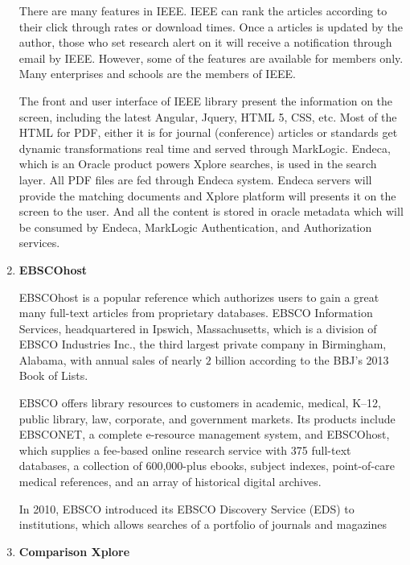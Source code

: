 \begin{enumerate}
	There are many features in IEEE. IEEE can rank the articles according to their click through rates or download times. 
    Once a articles is updated by the author, those who set research alert on it will receive a notification through email by IEEE.
    However, some of the features are available for members only.
    Many enterprises and schools are the members of IEEE.

	
	The front and user interface of IEEE library present the information on the screen, 
	including the latest Angular, Jquery, HTML 5, CSS, etc. 
	Most of the HTML for PDF, either it is for journal (conference) articles or standards get dynamic transformations real time and served through MarkLogic.
	Endeca, which is an Oracle product powers Xplore searches, is used in the search layer.
	All PDF files are fed through Endeca system.
	Endeca servers will provide the matching documents and Xplore platform will presents it on the screen to the user.
	And all the content is stored in oracle metadata which will be consumed by Endeca, MarkLogic Authentication, and Authorization services.
	
	\item\textbf{EBSCOhost}
	\setlength{\parindent}{1em}

	EBSCOhost is a popular reference which authorizes users to gain a great many full-text articles from proprietary databases.
	EBSCO Information Services, headquartered in Ipswich, Massachusetts, 
    which is a division of EBSCO Industries Inc., 
    the third largest private company in Birmingham, Alabama, with annual sales of nearly $2$ billion according to the BBJ's 2013 Book of Lists.

    EBSCO offers library resources to customers in academic, medical, K–12,  
    public library, law, corporate, and government markets. 
	Its products include EBSCONET, a complete e-resource management system,
    and EBSCOhost, which supplies a fee-based online research 
    service with 375 full-text databases, a collection
    of 600,000-plus ebooks, subject indexes, point-of-care 
    medical references, and an array of historical digital archives.

    In 2010, EBSCO introduced its EBSCO Discovery Service (EDS) to institutions,
    which allows searches of a portfolio of journals and magazines

	
	\item\textbf{Comparison Xplore}
	\setlength{\parindent}{1em}
	

\end{enumerate}
